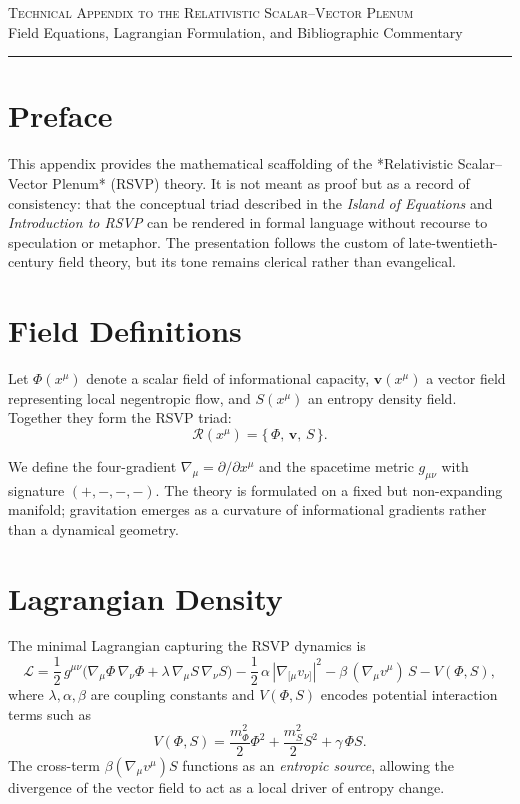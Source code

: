 \documentclass[12pt]{article}
\begin{document}
\begin{center}
{\Large\textsc{Technical Appendix to the Relativistic Scalar--Vector Plenum}}\\[1ex]
{\small Field Equations, Lagrangian Formulation, and Bibliographic Commentary}\\[2ex]
{\rule{0.4\textwidth}{0.4pt}}
\end{center}

\section*{Preface}

This appendix provides the mathematical scaffolding of the *Relativistic Scalar--Vector Plenum* (RSVP) theory.
It is not meant as proof but as a record of consistency: that the conceptual triad described in the \textit{Island of Equations} and \textit{Introduction to RSVP} can be rendered in formal language without recourse to speculation or metaphor.
The presentation follows the custom of late-twentieth-century field theory, but its tone remains clerical rather than evangelical.

\section{Field Definitions}

Let $\Phi(x^\mu)$ denote a scalar field of informational capacity, $\mathbf{v}(x^\mu)$ a vector field representing local negentropic flow, and $S(x^\mu)$ an entropy density field.  
Together they form the RSVP triad:
\[
\mathcal{R}(x^\mu) = \{\,\Phi,\, \mathbf{v},\, S\,\}.
\]

We define the four-gradient $\nabla_\mu = \partial / \partial x^\mu$ and the spacetime metric $g_{\mu\nu}$ with signature $(+,-,-,-)$.
The theory is formulated on a fixed but non-expanding manifold; gravitation emerges as a curvature of informational gradients rather than a dynamical geometry.

\section{Lagrangian Density}

The minimal Lagrangian capturing the RSVP dynamics is
\begin{equation}
\mathcal{L} = 
\frac{1}{2}\,g^{\mu\nu}\big( \nabla_\mu \Phi \,\nabla_\nu \Phi
+ \lambda\, \nabla_\mu S\,\nabla_\nu S \big)
- \frac{1}{2}\,\alpha\,|\nabla_{[\mu} v_{\nu]}|^2
- \beta\,(\nabla_\mu v^\mu)\,S
- V(\Phi, S),
\label{eq:lagrangian}
\end{equation}
where $\lambda, \alpha, \beta$ are coupling constants and $V(\Phi,S)$ encodes potential interaction terms such as
\[
V(\Phi,S) = \frac{m_\Phi^2}{2}\Phi^2 + \frac{m_S^2}{2}S^2 + \gamma\,\Phi S.
\]
The cross-term $\beta (\nabla_\mu v^\mu)S$ functions as an \textit{entropic source}, allowing the divergence of the vector field to act as a local driver of entropy change.
\end{document}
